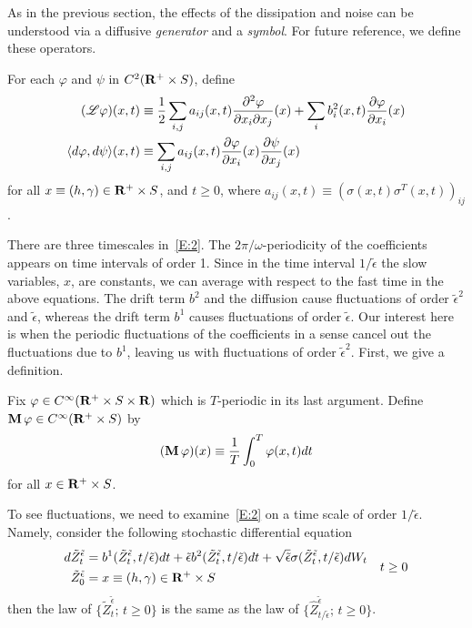 As in the previous section, the effects of the dissipation and noise can be understood via a diffusive \emph{generator} and a \emph{symbol}. For future reference, we define these operators.
\begin{definition}
\label{D:generator-case2}
For each $\varphi$ and $\psi$ in $C^2(\mathbf R^+ \times S)$, define
\begin{equation*}
\begin{aligned}
(\mathscr L \varphi)(x,t) &\equiv \frac12 \sum_{i,j}a_{i
j}(x,t)\frac{\partial^2 \varphi}{\partial x_i \partial x_j}(x)
+ \sum_{i} b^2_i(x,t)\frac{\partial \varphi}{\partial x_i}(x) \\
\langle d\varphi, d\psi\rangle (x,t) &\equiv
\sum_{i,j}a_{i j}(x,t)\frac{\partial \varphi}{\partial
x_i}(x)\frac{\partial \psi}{\partial x_j}(x)
\end{aligned}\end{equation*}
for all $x\equiv(h,\gamma)\in\mathbf R^+ \times S$, and $t\ge 0$, where $a_{i j}(x,t)\equiv(\sigma(x,t)\sigma^T(x,t))_{ij}$.
\end{definition}

There are three timescales in~\eqref{E:2}. The $2\pi/\omega$-periodicity of the coefficients appears on time intervals of order 1. Since in the time interval $1/\tilde\epsilon$ the slow variables, $x$, are constants, we can average with respect to the fast time in the above equations. The drift term $b^2$ and the diffusion cause fluctuations of order ${\tilde\epsilon^2}$ and $\tilde\epsilon$, whereas the drift term $b^1$ causes fluctuations of order $\tilde\epsilon$. Our interest here is when the periodic fluctuations of the coefficients in a sense cancel out the fluctuations due to $b^1$, leaving us with fluctuations of order $\tilde\epsilon^2$. First, we give a definition.
\begin{definition}
\label{D:Tave}
Fix $\varphi\in C^\infty(\mathbf R^+ \times S \times \mathbf R)$ which is $T$-periodic in its last argument. Define $\operatorname{\mathbf M}\varphi\in C^\infty(\mathbf R^+\times S)$ by
\begin{equation*}
(\operatorname{\mathbf M} \varphi)(x) \equiv \frac{1}{T} \int_0^T \varphi({x},t)dt
\end{equation*} for all $x\in \mathbf R^+ \times S$.\end{definition}

To see fluctuations, we need to examine~\eqref{E:2} on a time scale of order $1/{\tilde\epsilon}$. Namely, consider the following stochastic differential equation
\begin{equation}
\begin{aligned}
d \tilde Z_t^{\tilde\epsilon} &=  b^1 (\tilde Z_t^{\tilde\epsilon},t/\tilde\epsilon) dt
+ \tilde\epsilon b^2 (\tilde Z_t^{\tilde\epsilon},t/\tilde\epsilon) dt + \sqrt{\tilde\epsilon} \sigma (\tilde Z_t^{\tilde\epsilon},t/\tilde\epsilon)  d W_t\\
\tilde Z^{\tilde\epsilon}_0 &= x \equiv (h,\gamma) \in\mathbf R^+\times S
\end{aligned} \quad t \ge 0
\label{E:21}
\end{equation}
then the law of $\{\tilde Z^{\tilde\epsilon}_t;\, t\ge 0\}$ is the same as the law of $\{\hat Z^{\tilde\epsilon}_{t/\tilde\epsilon};\, t\ge 0\}$.

